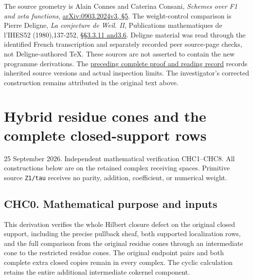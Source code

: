 The source geometry is Alain Connes and Caterina Consani, \emph{Schemes
over F1 and zeta functions},
\href{https://arxiv.org/abs/0903.2024v3}{arXiv:0903.2024v3, §5}. The
weight-control comparison is Pierre Deligne, \emph{La conjecture de
Weil. II}, Publications mathematiques de l'IHES52 (1980),137-252,
\href{https://www.numdam.org/item/PMIHES_1980__52__137_0/}{§§3.3.11
and3.6}. Deligne material was read through the identified French
transcription and separately recorded peer source-page checks, not
Deligne-authored TeX. These sources are not asserted to contain the new
programme derivations. The
\href{https://github.com/KokunoYumeto/zeta-function-research-reader/blob/36a82ecca98addb8a98b48204e349737856c7223/workbenches/splitzero-tandem/continuations/20260924-cohomology-weight-and-character-lifts/BUILD_AND_REVIEW.md}{preceding
complete proof and reading record} records inherited source versions and
actual inspection limits. The investigator's corrected construction
remains attributed in the original text above.

\chapter{Hybrid residue cones and the complete closed-support
rows}\label{hybrid-residue-cones-and-the-complete-closed-support-rows}

25 September 2026. Independent mathematical verification CHC1--CHC8. All
constructions below are on the retained complex receiving spaces.
Primitive source \texttt{Z1/tau} receives no parity, addition,
coefficient, or numerical weight.

\section{CHC0. Mathematical purpose and
inputs}\label{chc0.-mathematical-purpose-and-inputs}

This derivation verifies the whole Hilbert closure defect on the
original closed support, including the precise pullback sheaf, both
supported localization rows, and the full comparison from the original
residue cones through an intermediate cone to the restricted residue
cones. The original endpoint pairs and both complete extra closed copies
remain in every complex. The cyclic calculation retains the entire
additional intermediate cokernel component.

